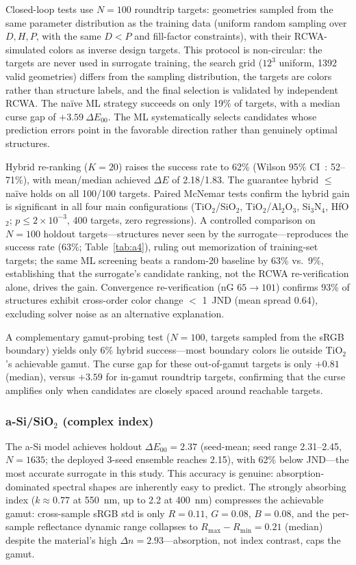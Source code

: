 \documentclass[10pt,twocolumn]{article}
\begin{document}
Closed-loop tests use $N = 100$ roundtrip targets: geometries sampled from the same parameter distribution as the training data (uniform random sampling over $D,H,P$, with the same $D < P$ and fill-factor constraints), with their RCWA-simulated colors as inverse design targets. This protocol is non-circular: the targets are never used in surrogate training, the search grid ($12^3$ uniform, 1392 valid geometries) differs from the sampling distribution, the targets are colors rather than structure labels, and the final selection is validated by independent RCWA. The na\"ive ML strategy succeeds on only 19\% of targets, with a median curse gap of $+3.59\ \Delta E_{00}$. The ML systematically selects candidates whose prediction errors point in the favorable direction rather than genuinely optimal structures.

Hybrid re-ranking ($K = 20$) raises the success rate to 62\% (Wilson 95\% CI~\cite{ref18}: 52--71\%), with mean/median achieved $\Delta E$ of 2.18/1.83. The guarantee hybrid $\le$ na\"ive holds on all 100/100 targets. Paired McNemar tests confirm the hybrid gain is significant in all four main configurations (TiO$_2$/SiO$_2$, TiO$_2$/Al$_2$O$_3$, Si$_3$N$_4$, HfO$_2$; $p \le 2\times10^{-3}$, 400 targets, zero regressions). A controlled comparison on $N=100$ holdout targets---structures never seen by the surrogate---reproduces the success rate (63\%; Table~\ref{tab:a4}), ruling out memorization of training-set targets; the same ML screening beats a random-20 baseline by 63\% vs.\ 9\%, establishing that the surrogate's candidate ranking, not the RCWA re-verification alone, drives the gain. Convergence re-verification (nG $65 \to 101$) confirms 93\% of structures exhibit cross-order color change $<$ 1~JND (mean spread 0.64), excluding solver noise as an alternative explanation.

A complementary gamut-probing test ($N = 100$, targets sampled from the sRGB boundary) yields only 6\% hybrid success---most boundary colors lie outside TiO$_2$'s achievable gamut. The curse gap for these out-of-gamut targets is only $+0.81$ (median), versus $+3.59$ for in-gamut roundtrip targets, confirming that the curse amplifies only when candidates are closely spaced around reachable targets.

\subsubsection{a-Si/SiO$_2$ (complex index)}

The a-Si model achieves holdout $\Delta E_{00} = 2.37$ (seed-mean; seed range 2.31--2.45, $N = 1635$; the deployed 3-seed ensemble reaches 2.15), with 62\% below JND---the most accurate surrogate in this study. This accuracy is genuine: absorption-dominated spectral shapes are inherently easy to predict. The strongly absorbing index ($k \approx 0.77$ at 550~nm, up to 2.2 at 400~nm) compresses the achievable gamut: cross-sample sRGB std is only $R = 0.11$, $G = 0.08$, $B = 0.08$, and the per-sample reflectance dynamic range collapses to $R_{\max}-R_{\min} = 0.21$ (median) despite the material's high $\Delta n = 2.93$---absorption, not index contrast, caps the gamut.
\end{document}
